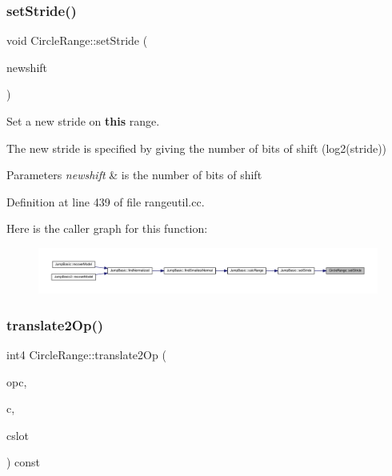 \subsubsection{\texorpdfstring{setStride()}{setStride()}}
{\footnotesize\ttfamily void Circle\+Range\+::set\+Stride (\begin{DoxyParamCaption}\item[{int4}]{newshift }\end{DoxyParamCaption})}



Set a new stride on {\bfseries{this}} range. 

The new stride is specified by giving the number of bits of shift (log2(stride)) 
\begin{DoxyParams}{Parameters}
{\em newshift} & is the number of bits of shift \\
\hline
\end{DoxyParams}


Definition at line 439 of file rangeutil.\+cc.

Here is the caller graph for this function\+:
\nopagebreak
\begin{figure}[H]
\begin{center}
\leavevmode
\includegraphics[width=350pt]{class_circle_range_a44fa8dca988417e0381e891268713a03_icgraph}
\end{center}
\end{figure}
\mbox{\label{class_circle_range_abcf8280b8e4527ec260c396b6590fdae}} 
\subsubsection{\texorpdfstring{translate2Op()}{translate2Op()}}
{\footnotesize\ttfamily int4 Circle\+Range\+::translate2\+Op (\begin{DoxyParamCaption}\item[{\mbox{\hyperlink{opcodes_8hh_abeb7dfb0e9e2b3114e240a405d046ea7}{Op\+Code}} \&}]{opc,  }\item[{\mbox{\hyperlink{types_8h_a2db313c5d32a12b01d26ac9b3bca178f}{uintb}} \&}]{c,  }\item[{int4 \&}]{cslot }\end{DoxyParamCaption}) const}



